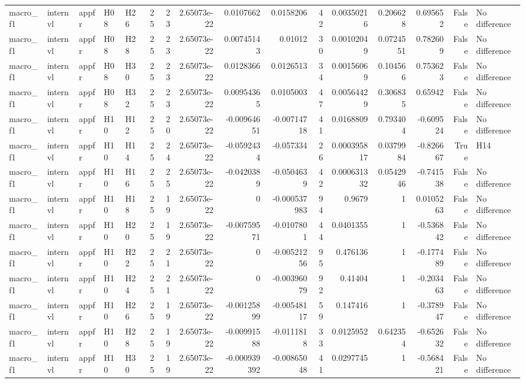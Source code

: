 \begin{longtable}{lllllrrrrrrrrrrl}
macro\_f1 & internvl & appfr & H08 & H26 & 25 & 23 & 2.65073e-22 & 0.0107662 & 0.0158206 & 42 & 0.00350216 & 0.206628 & 0.695652 & False & No difference \\
macro\_f1 & internvl & appfr & H08 & H28 & 25 & 23 & 2.65073e-22 & 0.00745143 & 0.01012 & 30 & 0.00102049 & 0.0724551 & 0.782609 & False & No difference \\
macro\_f1 & internvl & appfr & H08 & H30 & 25 & 23 & 2.65073e-22 & 0.0128366 & 0.0126513 & 34 & 0.00156069 & 0.104566 & 0.753623 & False & No difference \\
macro\_f1 & internvl & appfr & H08 & H32 & 25 & 23 & 2.65073e-22 & 0.00954365 & 0.0105003 & 47 & 0.00564429 & 0.306835 & 0.65942 & False & No difference \\
macro\_f1 & internvl & appfr & H10 & H12 & 25 & 20 & 2.65073e-22 & -0.00964651 & -0.00714718 & 41 & 0.0168809 & 0.793404 & -0.609524 & False & No difference \\
macro\_f1 & internvl & appfr & H10 & H14 & 25 & 24 & 2.65073e-22 & -0.0592434 & -0.057334 & 26 & 0.000395817 & 0.0379984 & -0.826667 & True & H14 \\
macro\_f1 & internvl & appfr & H10 & H16 & 25 & 25 & 2.65073e-22 & -0.0420389 & -0.0504639 & 42 & 0.000631332 & 0.0542946 & -0.741538 & False & No difference \\
macro\_f1 & internvl & appfr & H10 & H18 & 25 & 19 & 2.65073e-22 & 0 & -0.000537983 & 94 & 0.9679 & 1 & 0.0105263 & False & No difference \\
macro\_f1 & internvl & appfr & H10 & H20 & 25 & 19 & 2.65073e-22 & -0.00759571 & -0.0107801 & 44 & 0.0401355 & 1 & -0.536842 & False & No difference \\
macro\_f1 & internvl & appfr & H10 & H22 & 25 & 21 & 2.65073e-22 & 0 & -0.00521256 & 95 & 0.476136 & 1 & -0.177489 & False & No difference \\
macro\_f1 & internvl & appfr & H10 & H24 & 25 & 21 & 2.65073e-22 & 0 & -0.00396079 & 92 & 0.41404 & 1 & -0.203463 & False & No difference \\
macro\_f1 & internvl & appfr & H10 & H26 & 25 & 19 & 2.65073e-22 & -0.00125899 & -0.00548117 & 59 & 0.147416 & 1 & -0.378947 & False & No difference \\
macro\_f1 & internvl & appfr & H10 & H28 & 25 & 19 & 2.65073e-22 & -0.00991588 & -0.0111818 & 33 & 0.0125952 & 0.642354 & -0.652632 & False & No difference \\
macro\_f1 & internvl & appfr & H10 & H30 & 25 & 19 & 2.65073e-22 & -0.000939392 & -0.00865048 & 41 & 0.0297745 & 1 & -0.568421 & False & No difference \\

\end{longtable}
